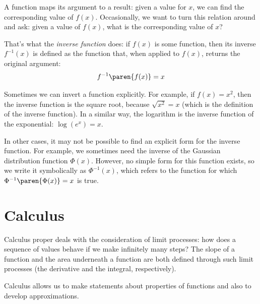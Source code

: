 
A function maps its argument to a result: given a value for $x$, we
can find the corresponding value of $f(x)$. Occasionally, we want to
turn this relation around and ask: given a value of $f(x)$, what is
the corresponding value of $x$? 

That's what the \emph{inverse function} does: if $f(x)$ is some
function, then its inverse $f^{-1}(x)$ is defined as the function
that, when applied to $f(x)$, returns the original argument:
%
\[
f^{-1}\paren{ f(x) } = x
\]
%

Sometimes we can invert a function explicitly. For example, if $f(x) =
x^2$, then the inverse function is the square root, because $\sqrt{
  x^2 } = x$ (which is the definition of the inverse function).  In a
similar way, the logarithm is the inverse function of the exponential:
$\log( e^x ) = x$.

In other cases, it may not be possible to find an explicit form for
the inverse function. For example, we sometimes need the inverse of
the Gaussian distribution function $\Phi(x)$. However, no simple form
for this function exists, so we write it symbolically as
$\Phi^{-1}(x)$, which refers to the function for which
$\Phi^{-1}\paren{ \Phi(x) } = x$ is true.


\section{Calculus}

Calculus proper deals with the consideration of limit processes: how
does a sequence of values behave if we make infinitely many steps? 
The slope of a function and the area underneath a function are both
defined through such limit processes (the derivative and the integral,
respectively).

Calculus allows us to make statements about properties of functions
and also to develop approximations.

